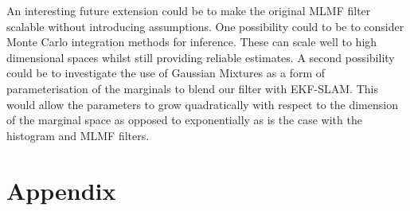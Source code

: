 An interesting future extension could be to make the original MLMF filter scalable without introducing assumptions.
One possibility could to be to consider Monte Carlo integration methods for inference. These can scale well to high dimensional 
spaces whilst still providing reliable estimates. A second possibility could be to investigate the use of Gaussian Mixtures as a 
form of parameterisation of the marginals to blend our filter with EKF-SLAM. This would allow the parameters 
to grow quadratically with respect to the dimension of the marginal space as opposed to exponentially as is the case 
with the histogram and MLMF filters.



\section{Appendix}\label{ch5:appendix}


